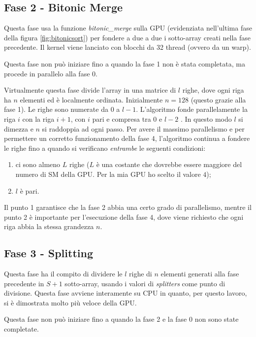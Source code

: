 \documentclass[a4paper, 11pt]{article}
\begin{document}
		\subsection{Fase 2 - Bitonic Merge}
			\label{fase2}
			Questa fase usa la funzione \emph{bitonic\_merge} sulla GPU (evidenziata nell'ultima fase della figura \ref{fig:bitonicsort}) per 
			fondere a due a due	i sotto-array creati nella fase precedente.			
			Il kernel viene lanciato con blocchi da 32 thread (ovvero da un warp).
			
			Questa fase non può iniziare fino a quando la fase 1 non è stata completata, ma procede in parallelo alla fase 0.
						
			Virtualmente questa fase divide l'array in una matrice di $l$ righe, dove ogni riga ha $n$ elementi ed è localmente ordinata.
			Inizialmente $n=128$ (questo grazie alla fase 1). 
			Le righe sono numerate da $0$ a $l-1$.
			L'algoritmo fonde parallelamente la riga $i$ con la riga $i+1$, con $i$ pari e compresa tra  $0$ e $l-2$ . 
			In questo modo $l$ si dimezza e $n$ si raddoppia ad ogni passo. 
			Per avere il massimo parallelismo e per permettere un corretto funzionamento della fase 4,
			l'algoritmo continua a fondere le righe fino a quando si verificano \emph{entrambe} le seguenti condizioni:
			\begin{enumerate}
				\item ci sono almeno $L$ righe ($L$ è una costante che dovrebbe essere maggiore del numero di SM della GPU. Per la mia GPU ho 
				scelto il valore $4$);
				\item $l$ è pari.
			\end{enumerate} 
			Il punto 1 garantisce che la fase 2 abbia una certo grado di parallelismo, mentre il punto 2 è importante per l'esecuzione della fase 
			4, dove viene richiesto che ogni riga abbia la stessa grandezza $n$.
		\subsection{Fase 3 - Splitting}
			\label{fase3}
			Questa fase ha il compito di dividere le $l$ righe di $n$ elementi generati alla fase precedente in $S + 1$ sotto-array, usando 
			i valori di	\emph{splitters} come punto di divisione.
			Questa fase avviene interamente su CPU in quanto, per questo lavoro, si è dimostrata molto più veloce della GPU.
			
			Questa fase non può iniziare fino a quando la fase 2 e la fase 0 non sono state completate.
			
\end{document}
